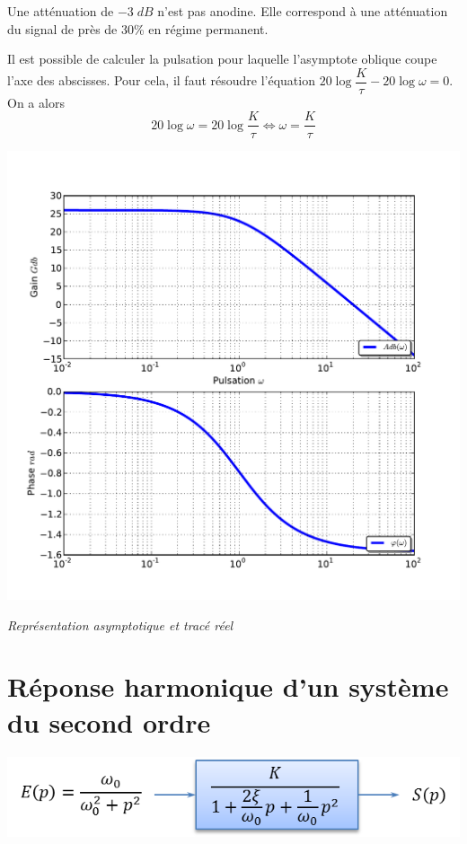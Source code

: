 \documentclass[10pt,oneside]{article}
\begin{document}
\begin{warn}
Une atténuation de $-3\; dB$ n'est pas anodine. Elle correspond à une atténuation du signal de près de 30\% en régime permanent.
\end{warn}


Il est possible de calculer la pulsation pour laquelle l'asymptote oblique coupe l'axe des abscisses. Pour cela, il faut résoudre l'équation
$ 20 \log \dfrac{K}{\tau} -20\log \omega = 0$.
On a alors 
$$ 20\log \omega =  20 \log \dfrac{K}{\tau} \Longleftrightarrow \omega =  { \dfrac{K}{\tau}} $$

\begin{center}
\includegraphics[width=.7\textwidth]{png/ordre1_bode.pdf}

\textit{Représentation asymptotique et tracé réel}
\end{center}

\section{Réponse harmonique d'un système du second ordre}

\begin{minipage}[c]{.48\linewidth}
\begin{center}
\includegraphics[width=.9\textwidth]{png/ordre2_bloc}
\end{center}
\end{minipage}\hfill
\begin{minipage}[c]{.48\linewidth}
\begin{center}

\end{center}
\end{minipage}
\end{document}
